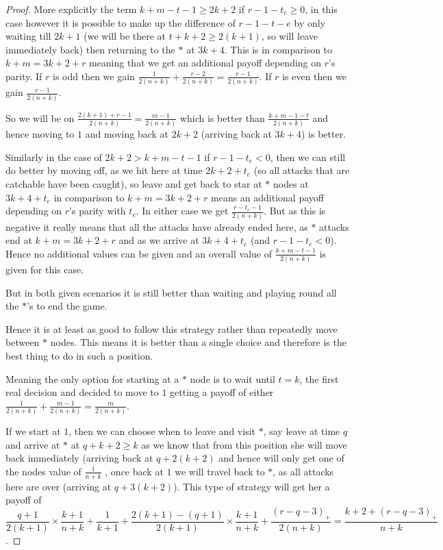 \documentclass[a4paper,10pt]{article}
\newcommand{\pospart}[1]{\left( #1 \right)_{+}}
\theoremstyle{definition}
\theoremstyle{definition}
\theoremstyle{remark}
\theoremstyle{definition}
\begin{document}
\begin{proof}
More explicitly the term $k+m-t-1 \geq 2k+2$ if $r-1-t_{e} \geq 0$, in this case however it is possible to make up the difference of $r-1-t-{e}$ by only waiting till $2k+1$ (we will be there at $t+k+2 \geq 2(k+1)$, so will leave immediately back) then returning to the $*$ at $3k+4$. This is in comparison to $k+m=3k+2+r$ meaning that we get an additional payoff depending on $r$'s parity.
If $r$ is odd then we gain $\frac{1}{2(n+k)}+\frac{r-2}{2(n+k)}=\frac{r-1}{2(n+k)}$.
If $r$ is even then we gain $\frac{r-1}{2(n+k)}$.

So we will be on $\frac{2(k+1)+r-1}{2(n+k)}=\frac{m-1}{2(n+k)}$ which is better than $\frac{k+m-1-t}{2(n+k)}$ and hence moving to $1$ and moving back at $2k+2$ (arriving back at $3k+4$) is better.

Similarly in the case of $2k+2> k+m-t-1$ if $r-1-t_{e} < 0$, then we can still do better by moving off, as we hit here at time $2k+2+t_{e}$ (so all attacks that are catchable have been caught), so leave and get back to star at $*$ nodes at $3k+4+t_{e}$ in comparison to $k+m=3k+2+r$ means an additional payoff depending on $r$'s parity with $t_{e}$.
In either case we get $\frac{r-t_{e}-1}{2(n+k)}$. But as this is negative it really means that all the attacks have already ended here, as $*$ attacks end at $k+m=3k+2+r$ and as we arrive at $3k+4+t_{e}$ (and $r-1-t_{e} < 0$). 
Hence no additional values can be given and an overall value of $\frac{k+m-t-1}{2(n+k)}$ is given for this case.

But in both given scenarios it is still better than waiting and playing round all the  $*$'s to end the game.

Hence it is at least as good to follow this strategy rather than repeatedly move between $*$ nodes. This means it is better than a single choice and therefore is the best thing to do in such a position.

Meaning the only option for starting at a $*$ node is to wait until $t=k$, the first real decision and decided to move to $1$ getting a payoff of either
$\frac{1}{2(n+k)}+\frac{m-1}{2(n+k)}=\frac{m}{2(n+k)}$.


If we start at $1$, then we can choose when to leave and visit $*$, say leave at time $q$ and arrive at $*$ at $q+k+2 \geq k$ as we know that from this position she will move back immediately (arriving back at $q+2(k+2)$ and hence will only get one of the nodes value of $\frac{1}{n+k}$ , once back at $1$ we will travel back to $*$, as all attacks here are over (arriving at $q+3(k+2)$). This type of strategy will get her a payoff of
$$\frac{q+1}{2(k+1)} \times \frac{k+1}{n+k} +\frac{1}{k+1} +\frac{2(k+1)-(q+1)}{2(k+1)} \times \frac{k+1}{n+k} +\frac{\pospart{r-q-3}}{2(n+k)} =\frac{k+2+\pospart{r-q-3}}{n+k} $$.


\end{proof}
\end{document}
